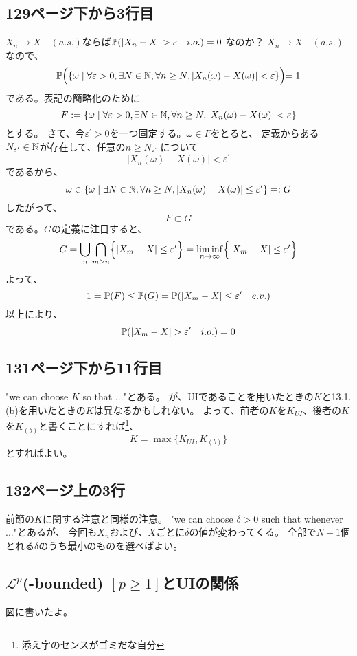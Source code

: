   \subsection{129ページ下から3行目}
    $X_n \rightarrow X \quad (a.s.)$ならば$\PP(|X_n - X|> \varepsilon \quad i.o.) = 0$
    なのか？
    $X_n \rightarrow X \quad (a.s.)$なので、
    \[
      {\mathbb{P}} \Bigr(\{\omega \mid \forall \varepsilon > 0, \exists N \in {\mathbb{N}}, \forall n \ge N, |X_n(\omega) - X(\omega)| < \varepsilon\}\Bigl) = 1
    \]
    である。表記の簡略化のために
    \[F := \{\omega \mid \forall \varepsilon > 0, \exists N \in {\mathbb{N}}, \forall n \ge N, |X_n(\omega) - X(\omega)| < \varepsilon\}\]
    とする。
    さて、今$\varepsilon^{\prime} > 0$を一つ固定する。$\omega \in F$をとると、
    定義からある$N_{\varepsilon^{\prime}} \in {\mathbb{N}}$が存在して、任意の$n \ge N_{\varepsilon^{\prime}}$
    について
    \[|X_n(\omega) - X(\omega)| < \varepsilon^{\prime}\]
    であるから、
    \[\omega \in \{\omega \mid \exists N \in {\mathbb{N}}, \forall n \ge N, |X_n(\omega) - X(\omega)| \leq \varepsilon^{\prime}\} =: G\]
    したがって、
    \[F \subset G\]
    である。$G$の定義に注目すると、
    \[G = \bigcup_n \bigcap_{m \ge n} \Bigl\{ |X_m - X| \leq \varepsilon^{\prime} \Bigr\} = \liminf_{n \to \infty}\Bigl\{ |X_m - X| \leq \varepsilon^{\prime} \Bigr\} \]
    よって、
    \[1 = {\mathbb{P}}(F) \leq {\mathbb{P}}(G) = {\mathbb{P}}(|X_m - X| \leq \varepsilon^{\prime} \quad e.v.)\]
    以上により、
    \[{\mathbb{P}}(|X_m - X| > \varepsilon^{\prime} \quad i.o.) = 0\]

    \subsection{131ページ下から11行目}
      "we can choose $K$ so that ..."とある。
      が、UIであることを用いたときの$K$と13.1.(b)を用いたときの$K$は異なるかもしれない。
      よって、前者の$K$を$K_{UI}$、後者の$K$を$K_{(b)}$と書くことにすれば\footnote{添え字のセンスがゴミだな自分}、
      \[K = \max\{K_{UI}, K_{(b)}\}\]
      とすればよい。

    \subsection{132ページ上の3行}
      前節の$K$に関する注意と同様の注意。
      "we can choose $\delta > 0$ such that whenever ..."とあるが、
      今回も$X_n$および、$X$ごとに$\delta$の値が変わってくる。
      全部で$N+1$個とれる$\delta$のうち最小のものを選べばよい。

    \subsection{$\mathcal{L}^p$(-bounded) $[p \ge 1]$とUIの関係}
      図に書いたよ。

